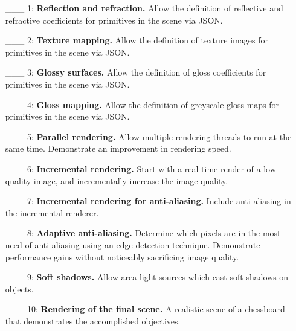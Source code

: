 \documentclass[12pt]{article}
\begin{document}
\begin{enumerate}
     \item[\_\_\_ 1:]  {\bf Reflection and refraction. } Allow the definition
     of reflective and refractive coefficients for primitives in the scene via JSON.

     \item[\_\_\_ 2:]  {\bf Texture mapping. } Allow the definition of texture images
     for primitives in the scene via JSON.

     \item[\_\_\_ 3:]  {\bf Glossy surfaces. } Allow the definition of gloss coefficients
     for primitives in the scene via JSON.

     \item[\_\_\_ 4:]  {\bf Gloss mapping. } Allow the definition of greyscale gloss maps for primitives in the scene via JSON.

     \item[\_\_\_ 5:]  {\bf Parallel rendering. } Allow multiple rendering threads
     to run at the same time. Demonstrate an improvement in rendering speed.

     \item[\_\_\_ 6:]  {\bf Incremental rendering. } Start with a real-time render
     of a low-quality image, and incrementally increase the image quality.

     \item[\_\_\_ 7:]  {\bf Incremental rendering for anti-aliasing. } Include anti-aliasing in the incremental renderer. 

     \item[\_\_\_ 8:]  {\bf Adaptive anti-aliasing. } Determine which pixels are in the most need of anti-aliasing using an edge detection technique. Demonstrate performance gains without noticeably sacrificing image quality.

     \item[\_\_\_ 9:]  {\bf Soft shadows. } Allow area light sources which cast soft shadows on objects.

     \item[\_\_\_ 10:]  {\bf Rendering of the final scene. } A realistic scene of a 
     chessboard that demonstrates the accomplished objectives.
\end{enumerate}

\end{document}
